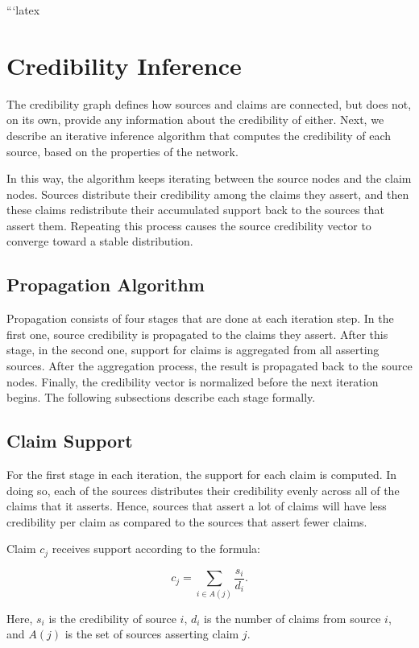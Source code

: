 ```latex
\section{Credibility Inference}

The credibility graph defines how sources and claims are connected, but does not, on its own, provide any information about the credibility of either. Next, we describe an iterative inference algorithm that computes the credibility of each source, based on the properties of the network.

In this way, the algorithm keeps iterating between the source nodes and the claim nodes. Sources distribute their credibility among the claims they assert, and then these claims redistribute their accumulated support back to the sources that assert them. Repeating this process causes the source credibility vector to converge toward a stable distribution.

\subsection{Propagation Algorithm}

Propagation consists of four stages that are done at each iteration step. In the first one, source credibility is propagated to the claims they assert. After this stage, in the second one, support for claims is aggregated from all asserting sources. After the aggregation process, the result is propagated back to the source nodes. Finally, the credibility vector is normalized before the next iteration begins. The following subsections describe each stage formally.

\subsection{Claim Support}

For the first stage in each iteration, the support for each claim is computed. In doing so, each of the sources distributes their credibility evenly across all of the claims that it asserts. Hence, sources that assert a lot of claims will have less credibility per claim as compared to the sources that assert fewer claims.

Claim $c_j$ receives support according to the formula:

\[
c_j =
\sum_{i \in A(j)}
\frac{s_i}{d_i}.
\]

Here, $s_i$ is the credibility of source $i$, $d_i$ is the number of claims from source $i$, and $A(j)$ is the set of sources asserting claim $j$.

